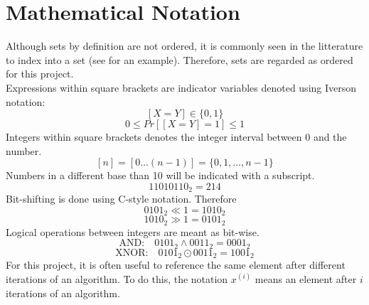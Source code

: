 \section{Mathematical Notation}
Although sets by definition are not ordered, it is commonly seen in the litterature to index into a set (see \cite{fast-similarity-search} for an example). Therefore, sets are regarded as ordered for this project.\\
Expressions within square brackets are indicator variables denoted using Iverson notation:
$$[X = Y] \in \{0, 1\}$$
$$0 \leq Pr[[X = Y] = 1] \leq 1$$
Integers within square brackets denotes the integer interval between 0 and the number.
$$[n] = [0 \dots (n-1)] = \{ 0, 1, \dots, n-1\}$$
Numbers in a different base than 10 will be indicated with a subscript.
$$11010110_2 = 214$$
Bit-shifting is done using C-style notation. Therefore 
$$0101_2 \ll 1 = 1010_2$$
$$1010_2 \gg 1 = 0101_2$$
Logical operations between integers are meant as bit-wise.
$$\textrm{AND:}\quad 0101_2 \land 0011_2 = 0001_2$$
$$\textrm{XNOR:}\quad 0101_2 \odot 0011_2 = 1001_2$$
For this project, it is often useful to reference the same element after different iterations of an algorithm. To do this, the notation $x^{(i)}$ means an element after $i$ iterations of an algorithm.
